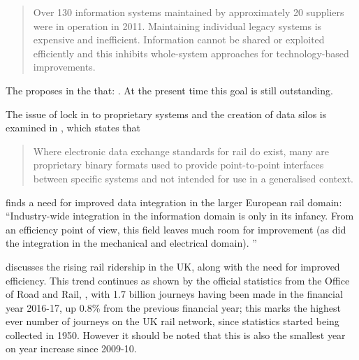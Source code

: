 \begin{quote}
Over 130 information systems maintained by approximately 20 suppliers were in operation in 2011. Maintaining individual legacy systems is expensive and inefficient. Information cannot be shared or exploited efficiently and this inhibits whole-system approaches for technology-based improvements. 
\end{quote}

The \citet{RDG2017} proposes in the  that: . At the present time this goal is still outstanding. 

The issue of lock in to proprietary systems and the creation of data silos is examined in \citet{Joh13}, which states that
\begin{quote}
    Where electronic data exchange standards for rail do exist, many are proprietary binary formats used to provide point-to-point interfaces between specific systems and not intended for use in a generalised context.
\end{quote}
\citet{Verstichel2011a} finds a need for improved data integration in the larger European rail domain: ``Industry-wide integration in the information domain is only in its infancy. From an efficiency point of view, this field leaves much room for improvement (as did the integration in the mechanical and electrical domain). ''

 \citet{Morris2014} discusses the rising rail ridership in the UK, along with the need for improved efficiency. This trend continues as shown by the official statistics from the Office of Road and Rail, \citet{OfficeofRoad&Rail2016}, with 1.7 billion journeys having been made in the financial year 2016-17, up 0.8\% from the previous financial year; this marks the highest ever number of journeys on the UK rail network, since statistics started being collected in 1950. However it should be noted that this is also the smallest year on year increase since 2009-10.

